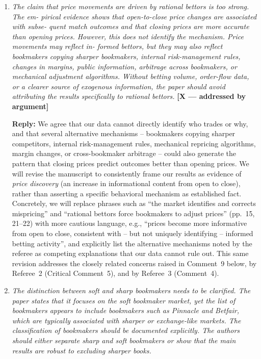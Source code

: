 \documentclass[letterpaper,12pt]{article}
\newcounter{b}
\newcommand{\argX}{\textcolor{green!55!black}{\textbf{[X --- addressed by argument]}}}
\newcommand{\Reply}[1]{\par\noindent\textbf{Reply:} #1}
\begin{document}
\begin{enumerate}
\item \textit{The claim that price movements are driven by rational bettors is too strong. The em-
pirical evidence shows that open-to-close price changes are associated with subse-
quent match outcomes and that closing prices are more accurate than opening prices.
However, this does not identify the mechanism. Price movements may reflect in-
formed bettors, but they may also reflect bookmakers copying sharper bookmakers,
internal risk-management rules, changes in margins, public information, arbitrage
across bookmakers, or mechanical adjustment algorithms. Without betting volume,
order-flow data, or a clearer source of exogenous information, the paper should avoid
attributing the results specifically to rational bettors. } \argX

\Reply{We agree that our data cannot directly identify who trades or why, and that several alternative mechanisms -- bookmakers copying sharper competitors, internal risk-management rules, mechanical repricing algorithms, margin changes, or cross-bookmaker arbitrage -- could also generate the pattern that closing prices predict outcomes better than opening prices. We will revise the manuscript to consistently frame our results as evidence of \emph{price discovery} (an increase in informational content from open to close), rather than asserting a specific behavioral mechanism as established fact. Concretely, we will replace phrases such as ``the market identifies and corrects mispricing'' and ``rational bettors force bookmakers to adjust prices'' (pp.~15, 21--22) with more cautious language, e.g., ``prices become more informative from open to close, consistent with -- but not uniquely identifying -- informed betting activity'', and explicitly list the alternative mechanisms noted by the referee as competing explanations that our data cannot rule out. This same revision addresses the closely related concerns raised in Comment~9 below, by Referee~2 (Critical Comment~5), and by Referee~3 (Comment~4).}

\item \textit{The distinction between soft and sharp bookmakers needs to be clarified. The paper
states that it focuses on the soft bookmaker market, yet the list of bookmakers appears
to include bookmakers such as Pinnacle and Betfair, which are typically associated
with sharper or exchange-like markets. The classification of bookmakers should be
documented explicitly. The authors should either separate sharp and soft bookmakers
or show that the main results are robust to excluding sharper books. }


\end{enumerate}
\end{document}
